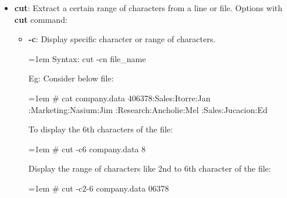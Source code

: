 \begin{flushleft}
\begin{itemize}
		\item \textbf{cut}: Extract a certain range of characters from a line or file.
		\newline
		Options with \textbf{cut} command:
		\begin{itemize}
		\item  \textbf{-c}: Display specific character or range of characters.
		\bigskip
		\begin{tcolorbox}[breakable,notitle,boxrule=-0pt,colback=pink,colframe=pink]
			\color{black}
			\font=1em
			Syntax: cut -cn  file\_name
			\font=4pt
		\end{tcolorbox}
		Eg: Consider below file:
		\bigskip
		\begin{tcolorbox}[breakable,notitle,boxrule=-0pt,colback=black,colframe=black]
			\color{green}
			\font=1em
			\# cat company.data
			\newline
			\color{white}
			406378:Sales:Itorre:Jan
			:Marketing:Nasium:Jim
			:Research:Ancholie:Mel
			:Sales:Jucacion:Ed
			\font=4pt
		\end{tcolorbox}		
		\bigskip
		To display the 6th characters of the file:
		\bigskip
		\begin{tcolorbox}[breakable,notitle,boxrule=-0pt,colback=black,colframe=black]
			\color{green}
			\font=1em
			\# cut -c6 company.data
			\newline
			\color{white}
			8
			\font=4pt
		\end{tcolorbox}		
		\bigskip
		Display the range of characters like 2nd to 6th character of the file:
		\bigskip
		\begin{tcolorbox}[breakable,notitle,boxrule=-0pt,colback=black,colframe=black]
			\color{green}
			\font=1em
			\# cut -c2-6 company.data
			\newline
			\color{white}
			06378
			\font=4pt
		\end{tcolorbox}		
		\bigskip


\end{itemize}
\end{itemize}
\end{flushleft}
